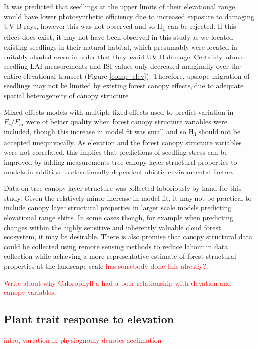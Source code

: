 \documentclass[a4paper, 11pt]{article}
\newcommand{\todo}[1]{\textcolor{red}{#1}}   %
\begin{document}
It was predicted that seedlings at the upper limits of their elevational range would have lower photosynthetic efficiency due to increased exposure to damaging UV-B rays, however this was not observed and so H\textsubscript{1} can be rejected. If this effect does exist, it may not have been observed in this study as we located existing seedlings in their natural habitat, which presumably were located in suitably shaded areas in order that they avoid UV-B damage. Certainly, above-seedling LAI measurements and ISI values only decreased marginally over the entire elevational transect (Figure \ref{comp_elev}). Therefore, upslope migration of seedlings may not be limited by existing forest canopy effects, due to adequate spatial heterogeneity of canopy structure.

Mixed effects models with multiple fixed effects used to predict variation in $F_v/F_m$ were of better quality when forest canopy structure variables were included, though this increase in model fit was small and so H\textsubscript{3} should not be accepted unequivocally. As elevation and the forest canopy structure variables were not correlated, this implies that predictions of seedling stress can be improved by adding measurements tree canopy layer structural properties to models in addition to elevationally dependent abiotic environmental factors. 

Data on tree canopy layer structure was collected laboriously by hand for this study. Given the relatively minor increase in model fit, it may not be practical to include canopy layer structural properties in larger scale models predicting elevational range shifts. In some cases though, for example when predicting changes within the highly sensitive and inherently valuable cloud forest ecosystem, it may be desirable. There is also promise that canopy structural data could be collected using remote sensing methods to reduce labour in data collection while achieving a more representative estimate of forest structural properties at the landscape scale \todo{has somebody done this already?}.

\todo{Write about why Chlorophyll-a had a poor relationship with elevation and canopy variables.}

\subsection{Plant trait response to elevation}

\todo{intro, variation in physiognomy denotes acclimation}
\end{document}

